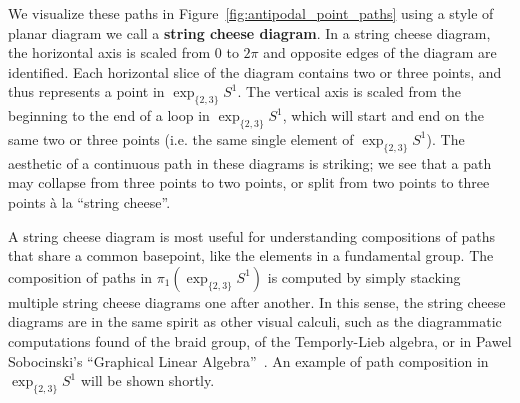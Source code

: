 \documentclass[12pt,twoside]{reedthesis}
\theoremstyle{definition}
\newcommand{\exptwothree}{\exp_{\{2,3\}}}
\newcommand{\defnphrase}[1]{\textbf{#1}}
\begin{document}
We visualize these paths in Figure~\ref{fig:antipodal_point_paths} using a style of planar diagram we call a \defnphrase{string cheese diagram}.
In a string cheese diagram, the horizontal axis is scaled from 0 to $2\pi$ and opposite edges of the diagram are identified.
Each horizontal slice of the diagram contains two or three points, and thus represents a point in $\exptwothree S^1$.
The vertical axis is scaled from the beginning to the end of a loop in $\exptwothree S^1$, which will start and end on the same two or three points (i.e. the same single element of $\exptwothree S^1$).
The aesthetic of a continuous path in these diagrams is striking; we see that a path may collapse from three points to two points, or split from two points to three points \` a la ``string cheese''.

A string cheese diagram is most useful for understanding compositions of paths that share a common basepoint, like the elements in a fundamental group.
The composition of paths in $\pi_1(\exptwothree S^1)$ is computed by simply stacking multiple string cheese diagrams one after another.
In this sense, the string cheese diagrams are in the same spirit as other visual calculi, such as the diagrammatic computations found of the braid group, of the Temporly-Lieb algebra, or in Pawel Sobocinski's ``Graphical Linear Algebra''~\cite{graphicallinearalgebra}.
An example of path composition in $\exptwothree S^1$ will be shown shortly.
\end{document}
